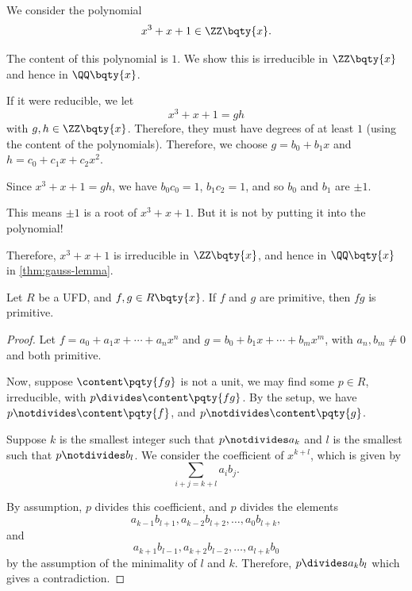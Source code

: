 \begin{example}
    \label{ex:application-gausss-lemma}%
    We consider the polynomial
    \[
        x^3 + x + 1 \in \ZZ\bqty{x}.
    \]

    The content of this polynomial is \(1\). We show this is irreducible in \(\ZZ\bqty{x}\) and hence in \(\QQ\bqty{x}\).

    If it were reducible, we let
    \[
        x^3 + x + 1 = gh
    \]
    with \(g, h \in \ZZ\bqty{x}\). Therefore, they must have degrees of at least \(1\) (using the content of the polynomials). Therefore, we choose \(g = b_0 + b_1 x\) and \(h = c_0 + c_1 x + c_2 x^2\).

    Since \(x^3 + x + 1 = gh\), we have \(b_0 c_0 = 1\), \(b_1 c_2 = 1\), and so \(b_0\) and \(b_1\) are \(\pm 1\).
    
    This means \(\pm 1\) is a root of \(x^3 + x + 1\). But it is not by putting it into the polynomial!

    Therefore, \(x^3 + x + 1\) is irreducible in \(\ZZ\bqty{x}\), and hence in \(\QQ\bqty{x}\) in \autoref{thm:gauss-lemma}.
\end{example}

\begin{lemma}
    \label{lem:gauss-lemma-primitive}
    Let \(R\) be a UFD, and \(f, g \in R\bqty{x}\). If \(f\) and \(g\) are primitive, then \(fg\) is primitive.
\end{lemma}

\begin{proof}
    Let \(f = a_0 + a_1 x + \cdots + a_n x^n\) and \(g = b_0 + b_1 x + \cdots + b_m x^m\), with \(a_n, b_m \neq 0\) and both primitive.

    Now, suppose \(\content\pqty{fg}\) is not a unit, we may find some \(p \in R\), irreducible, with \(p \divides \content\pqty{fg}\). By the setup, we have \(p\notdivides \content\pqty{f}\), and \(p\notdivides \content\pqty{g}\).

    Suppose \(k\) is the smallest integer such that \(p \notdivides a_k\) and \(l\) is the smallest such that \(p \notdivides b_l\). We consider the coefficient of \(x^{k + l}\), which is given by
    \[
        \sum_{i + j = k + l} a_i b_j.
    \]

    By assumption, \(p\) divides this coefficient, and \(p\) divides the elements
    \[
        a_{k - 1} b_{l + 1}, a_{k - 2} b_{l + 2}, \ldots, a_0 b_{l + k},
    \]
    and
    \[
        a_{k + 1} b_{l - 1}, a_{k + 2} b_{l - 2}, \ldots, a_{l + k} b_0
    \]
    by the assumption of the minimality of \(l\) and \(k\). Therefore, \(p \divides a_k b_l\) which gives a contradiction. 
\end{proof}

